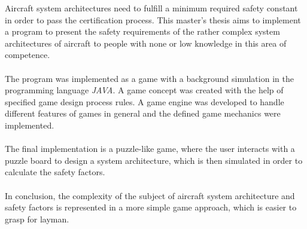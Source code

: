 
{\LARGE \thetitle}

Aircraft system architectures need to fulfill a minimum required safety constant in order to pass the certification process.
This master’s thesis aims to implement a program to present the safety requirements of the rather complex system architectures
of aircraft to people with none or low knowledge in this area of competence.
\\ \\
The program was implemented as a game with a background simulation in the programming language \textit{JAVA}.
A game concept was created with the help of specified game design process rules.
A game engine was developed to handle different features of games in general and the defined game mechanics were implemented.
\\ \\
The final implementation is a puzzle-like game, where the user interacts with a puzzle board to design a system architecture,
which is then simulated in order to calculate the safety factors.
\\ \\
In conclusion, the complexity of the subject of aircraft system architecture and safety factors is represented in a more simple
game approach, which is easier to grasp for layman.




